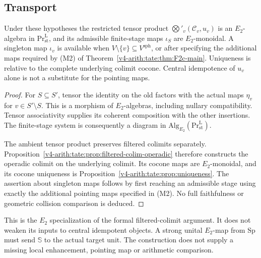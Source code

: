\subsection{Transport}

\begin{theorem}[F2.c \(E_2\) transport]
\label{v4-arith:w5-h:thm:f2c-e2-transport}
Under these hypotheses the restricted tensor product
\(\bigotimes'_v(\mathcal C_v,u_v)\) is an \(E_2\)-algebra in
\(\mathrm{Pr}^{\mathrm L}_{\mathrm{st}}\), and its admissible
finite-stage maps \(\iota_S\) are \(E_2\)-monoidal. A singleton
map \(\iota_v\) is available when
\(V\setminus\{v\}\subseteq V^{\mathrm{sph}}\), or after
specifying the additional maps required by (M2) of
Theorem~\ref{v4-arith:tate:thm:F2c-main}. Uniqueness is relative
to the complete underlying colimit cocone. Central idempotence
of \(u_v\) alone is not a substitute for the pointing maps.
\end{theorem}

\begin{proof}
For \(S\subseteq S'\), tensor the identity on the old factors
with the actual maps \(\eta_v\) for \(v\in S'\setminus S\).
This is a morphism of \(E_2\)-algebras, including nullary
compatibility. Tensor associativity supplies its coherent
composition with the other insertions. The finite-stage system
is consequently a diagram in
\(\mathrm{Alg}_{E_2}(\mathrm{Pr}^{\mathrm L}_{\mathrm{st}})\).

The ambient tensor product preserves filtered colimits
separately. Proposition~\ref{v4-arith:tate:prop:filtered-colim-operadic}
therefore constructs the operadic colimit on the underlying
colimit. Its cocone maps are \(E_2\)-monoidal, and its cocone
uniqueness is Proposition~\ref{v4-arith:tate:prop:uniqueness}.
The assertion about singleton maps follows by first reaching an
admissible stage using exactly the additional pointing maps
specified in (M2). No full faithfulness or geometric collision
comparison is deduced.
\end{proof}

\begin{remark}
\label{v4-arith:w5-h:rem:f2c-value-add}
This is the \(E_2\) specialization of the formal filtered-colimit
argument. It does not weaken its inputs to central idempotent
objects. A strong unital \(E_2\)-map from \(\mathrm{Sp}\) must
send \(\mathbb S\) to the actual target unit. The construction
does not supply a missing local enhancement, pointing map or
arithmetic comparison.
\end{remark}

